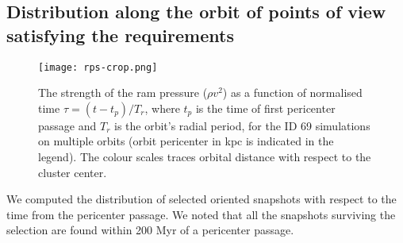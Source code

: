 \subsection{Distribution along the orbit of points of view satisfying the requirements}
\begin{figure}
\centering
\texttt{[image: rps-crop.png]}
\caption{The strength of the ram pressure ($\rho v^2$) as a function of normalised time $\tau = (t-t_p)/T_r$, where $t_p$ is the time of first pericenter passage and $T_r$ is the orbit's radial period, for the ID 69 simulations on multiple orbits (orbit pericenter in kpc is indicated in the legend). The colour scales traces orbital distance with respect to the cluster center.}
\label{fig:r_rps}
\end{figure}
We computed the distribution of selected oriented snapshots with respect to the time from the pericenter passage.
We noted that all the snapshots surviving the selection are found within 200 Myr of a pericenter passage.

